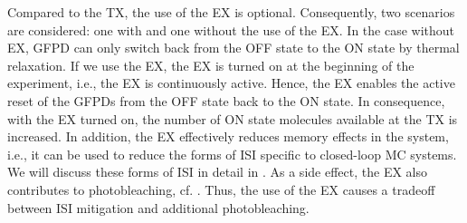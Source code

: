 Compared to the \ac{TX}, the use of the \ac{EX} is optional. Consequently, two scenarios are considered: one with and one without the use of the \ac{EX}. In the case without \ac{EX}, \ac{GFPD} can only switch back from the OFF state to the ON state by thermal relaxation. If we use the \ac{EX}, the \ac{EX} is turned on at the beginning of the experiment, i.e., the \ac{EX} is continuously active. Hence, the \ac{EX} enables the active reset of the \acp{GFPD} from the OFF state back to the ON state.  In consequence, with the \ac{EX} turned on, the number of ON state molecules available at the \ac{TX} is increased. In addition, the \ac{EX} effectively reduces memory effects in the system, i.e., it can be used to reduce the forms of \ac{ISI} specific to closed-loop \ac{MC} systems. We will discuss these forms of \ac{ISI} in detail in . As a side effect, the \ac{EX} also contributes to photobleaching, cf. . Thus, the use of the \ac{EX} causes a tradeoff between \ac{ISI} mitigation and additional photobleaching.